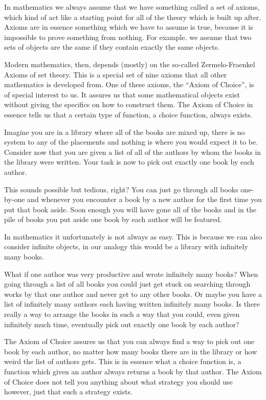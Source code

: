\documentclass[../../main.tex]{subfiles}
\begin{document}
In mathematics we always assume that we have something called a set of axioms, 
which kind of act like a starting point for all of the theory which is built up after.
Axioms are in essence something which we have to assume is true, because it is impossible to prove something from nothing.
For example. we assume that two sets of objects are the same if they contain exactly the same objects.

Modern mathematics, then, depends (mostly) on the so-called Zermelo-Fraenkel Axioms of set theory.
This is a special set of nine axioms that all other mathematics is developed from.
One of these axioms, the ``Axiom of Choice'', is of special interest to us.
It assures us that some mathematical objects exist without giving the specifics on how to construct them.
The Axiom of Choice in essence tells us that a certain type of function, a choice function, always exists.

Imagine you are in a library where all of the books are mixed up, there is no system to any of the placements and nothing is where you would expect it to be.
Consider now that you are given a list of all of the authors by whom the books in the library were written.
Your task is now to pick out exactly one book by each author.

This sounds possible but tedious, right? 
You can just go through all books one-by-one and whenever you encounter a book by a new author for the first time you put that book aside.
Soon enough you will have gone all of the books and in the pile of books you put aside one book by each author will be featured.

In mathematics it unfortunately is not always as easy.
This is because we can also consider infinite objects, in our analogy this would be a library with infinitely many books.

What if one author was very productive and wrote infinitely many books?
When going through a list of all books you could just get stuck on searching through works by that one author and never get to any other books.
Or maybe you have a list of infinitely many authors each having written infinitely many books.
Is there really a way to arrange the books in such a way that you could, even given infinitely much time, eventually pick out exactly one book by each author?

The Axiom of Choice assures us that you can always find a way to pick out one book by each author, 
no matter how many books there are in the library or how weird the list of authors gets.
This is in essence what a choice function is, a function which given an author always returns a book by that author.
The Axiom of Choice does not tell you anything about what strategy you should use however, just that such a strategy exists.
\end{document}
